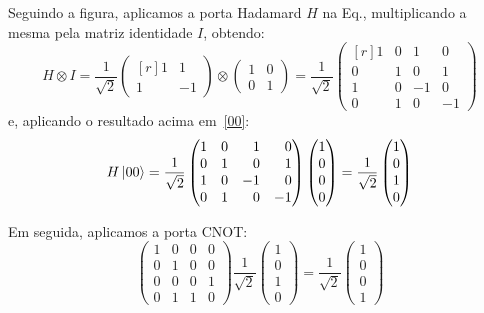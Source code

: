 Seguindo a figura, aplicamos a porta Hadamard \(H\) na Eq., multiplicando a mesma pela matriz identidade \(I\), obtendo:
\begin{equation}
H \otimes I = \frac{1}{\sqrt{2}} \begin{pmatrix*}[r]
1 & 1 \\
1 & -1
\end{pmatrix*} \otimes \begin{pmatrix}
1 & 0 \\
0 & 1
\end{pmatrix} = \frac{1}{\sqrt{2}} \begin{pmatrix*}[r]
1 & 0 & 1 & 0 \\
0 & 1 & 0 & 1 \\
1 & 0 & -1 & 0 \\
0 & 1 & 0 & -1
\end{pmatrix*}
\end{equation}
e, aplicando o resultado acima em~\eqref{00}:
\begin{equation}
H \ket{00} = \frac{1}{\sqrt{2}} \begin{pmatrix*}[r]
1 & 0 & 1 & 0 \\
0 & 1 & 0 & 1 \\
1 & 0 & -1 & 0 \\
0 & 1 & 0 & -1
\end{pmatrix*} \begin{pmatrix}
1 \\
0 \\
0 \\
0
\end{pmatrix} = \frac{1}{\sqrt{2}} \begin{pmatrix}
1 \\
0 \\
1 \\
0
\end{pmatrix}
\end{equation}

Em seguida, aplicamos a porta CNOT:
\begin{equation}
\begin{pmatrix}
1 & 0 & 0 & 0 \\
0 & 1 & 0 & 0 \\
0 & 0 & 0 & 1 \\
0 & 1 & 1 & 0
\end{pmatrix}
\frac{1}{\sqrt{2}}\begin{pmatrix}
1 \\
0 \\
1 \\
0
\end{pmatrix} = \frac{1}{\sqrt{2}} \begin{pmatrix}
1 \\
0 \\
0 \\
1
\end{pmatrix}
\end{equation}

